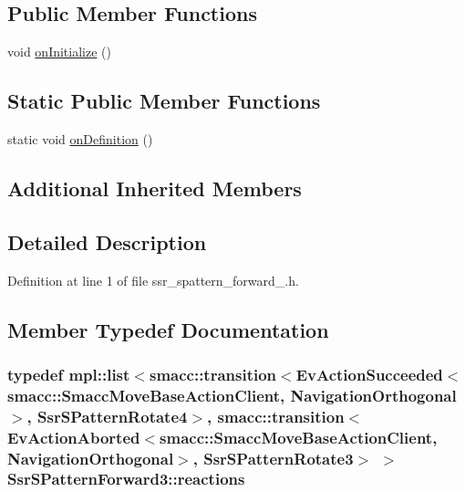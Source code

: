 \subsection*{Public Member Functions}
\begin{DoxyCompactItemize}
\item 
void \hyperlink{structSsrSPatternForward3_a9548fa20d98d23f9b90a1cdaf3c904f9}{on\+Initialize} ()
\end{DoxyCompactItemize}
\subsection*{Static Public Member Functions}
\begin{DoxyCompactItemize}
\item 
static void \hyperlink{structSsrSPatternForward3_ac48e2ef7fa1fcbd44890c24f8e34ef6f}{on\+Definition} ()
\end{DoxyCompactItemize}
\subsection*{Additional Inherited Members}


\subsection{Detailed Description}


Definition at line 1 of file ssr\+\_\+spattern\+\_\+forward\+\_.\+h.



\subsection{Member Typedef Documentation}
\subsubsection[{\texorpdfstring{reactions}{reactions}}]{\setlength{\rightskip}{0pt plus 5cm}typedef mpl\+::list$<${\bf smacc\+::transition}$<$Ev\+Action\+Succeeded$<${\bf smacc\+::\+Smacc\+Move\+Base\+Action\+Client}, {\bf Navigation\+Orthogonal}$>$, {\bf Ssr\+S\+Pattern\+Rotate4}$>$, {\bf smacc\+::transition}$<$Ev\+Action\+Aborted$<${\bf smacc\+::\+Smacc\+Move\+Base\+Action\+Client}, {\bf Navigation\+Orthogonal}$>$, {\bf Ssr\+S\+Pattern\+Rotate3}$>$ $>$ {\bf Ssr\+S\+Pattern\+Forward3\+::reactions}}\hypertarget{structSsrSPatternForward3_ae9f5e625bcb7c0b7f04ad2cf6b37b13f}{}\label{structSsrSPatternForward3_ae9f5e625bcb7c0b7f04ad2cf6b37b13f}


